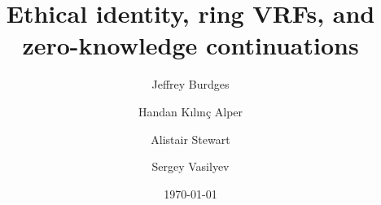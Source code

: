 \documentclass{llncs}
\title{Ethical identity, ring VRFs, and zero-knowledge continuations}
\author{Jeffrey Burdges \and Handan K{\i}l{\i}nç Alper \and Alistair Stewart \and Sergey Vasilyev}
\institute{Web 3.0 Foundation}
\date{\today}
\begin{document}
	
\maketitle

\begin{abstract}

\end{abstract}



% 









%




% 




\appendix



\end{document}
